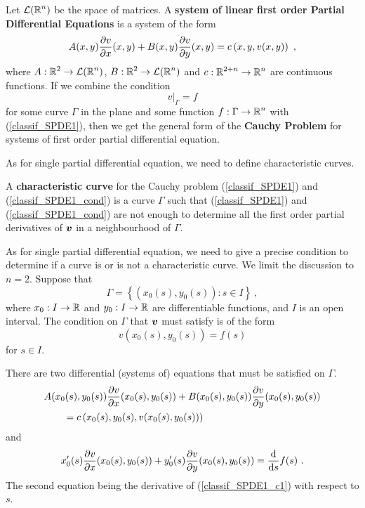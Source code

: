 Let $\DS \LL(\RR^n)$ be the space of \nn matrices.  A
{\bfseries system of linear first order Partial Differential Equations}%
 is
a system of the form
\begin{equation} \label{classif_SPDE1}
A(x,y) \pdydx{v}{x}(x,y) + B(x,y) \pdydx{v}{y}(x,y) =
c\left(x,y,v(x,y)\right) \ ,
\end{equation}
where $\DS A:\RR^2\rightarrow \LL(\RR^n)$,
$\DS B:\RR^2\rightarrow \LL(\RR^n)$ and
$\DS c:\RR^{2+n}\rightarrow \RR^n$ are continuous functions.
If we combine the condition
\begin{equation} \label{classif_SPDE1_cond}
v\big|_\Gamma = f
\end{equation}
for some curve $\Gamma$ in the plane and some function
$\DS f:\Gamma \rightarrow \RR^n$ with
(\ref{classif_SPDE1}), then we get the general form of the
{\bfseries Cauchy Problem} for systems of first
order partial differential equation. 

As for single partial differential equation, we need to define
characteristic curves.

\begin{defn}
A {\bfseries characteristic curve} for the
Cauchy problem (\ref{classif_SPDE1}) and (\ref{classif_SPDE1_cond}) is a
curve $\Gamma$ such that (\ref{classif_SPDE1}) and
(\ref{classif_SPDE1_cond}) are not enough to determine all
the first order partial derivatives of $\VEC{v}$ in a neighbourhood of
$\Gamma$.
\end{defn}

As for single partial differential equation, we need to give a precise
condition to determine if a curve is or is not a characteristic curve.
We limit the discussion to $n=2$. Suppose that
\begin{equation} \label{classif_GammaEq2}
\Gamma = \left\{ (x_0(s), y_0(s)) : s \in I \right\} \ ,
\end{equation}
where $x_0:I\rightarrow \RR$ and $y_0:I\rightarrow \RR$ are
differentiable functions, and $I$ is an open interval.  The condition
on $\Gamma$ that $\VEC{v}$ must satisfy is of the form
\begin{equation} \label{classif_SPDE1_c1}
v(x_0(s),y_0(s)) = f(s)
\end{equation}
for $s\in I$.

There are two differential (systems of) equations that must be
satisfied on $\Gamma$.
\begin{equation} \label{classif_SPDE1_c2}
\begin{split}
&A(x_0(s),y_0(s)) \pdydx{v}{x}(x_0(s),y_0(s)) + B(x_0(s),y_0(s))
\pdydx{v}{y}(x_0(s),y_0(s)) \\
&\qquad =c\left(x_0(s),y_0(s),v(x_0(s),y_0(s))\right)
\end{split}
\end{equation}
and
\begin{equation} \label{classif_SPDE1_c3}
x_0'(s)\pdydx{v}{x}(x_0(s),y_0(s)) +
y_0'(s)\pdydx{v}{y}(x_0(s),y_0(s)) = \dfdx{f}{s}(s) \ .
\end{equation}
The second equation being the derivative of (\ref{classif_SPDE1_c1})
with respect to $s$.

